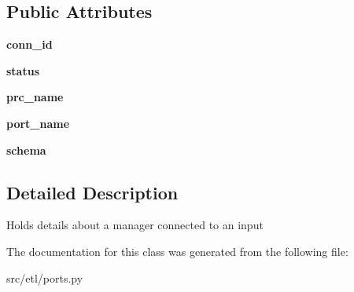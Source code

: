 \subsection*{Public Attributes}
\begin{DoxyCompactItemize}
\item 
\hypertarget{classetl_1_1ports_1_1EtlInputConnection_ab93181d0d0fbfb7438fb9cf242a08b50}{{\bfseries conn\-\_\-id}}\label{classetl_1_1ports_1_1EtlInputConnection_ab93181d0d0fbfb7438fb9cf242a08b50}

\item 
\hypertarget{classetl_1_1ports_1_1EtlInputConnection_aaec9231f33d131f6ff0ae4e319253f58}{{\bfseries status}}\label{classetl_1_1ports_1_1EtlInputConnection_aaec9231f33d131f6ff0ae4e319253f58}

\item 
\hypertarget{classetl_1_1ports_1_1EtlInputConnection_a8223fa4ed1d57909f95af7b9cb2d27fc}{{\bfseries prc\-\_\-name}}\label{classetl_1_1ports_1_1EtlInputConnection_a8223fa4ed1d57909f95af7b9cb2d27fc}

\item 
\hypertarget{classetl_1_1ports_1_1EtlInputConnection_a91fbf1b0ae7d316e3dd47519d831f087}{{\bfseries port\-\_\-name}}\label{classetl_1_1ports_1_1EtlInputConnection_a91fbf1b0ae7d316e3dd47519d831f087}

\item 
\hypertarget{classetl_1_1ports_1_1EtlInputConnection_a8243b6dc6d8243f8ffd166cc44d9135a}{{\bfseries schema}}\label{classetl_1_1ports_1_1EtlInputConnection_a8243b6dc6d8243f8ffd166cc44d9135a}

\end{DoxyCompactItemize}


\subsection{Detailed Description}
\begin{DoxyVerb}Holds details about a manager connected to an input\end{DoxyVerb}
 

The documentation for this class was generated from the following file\-:\begin{DoxyCompactItemize}
\item 
src/etl/ports.\-py\end{DoxyCompactItemize}
